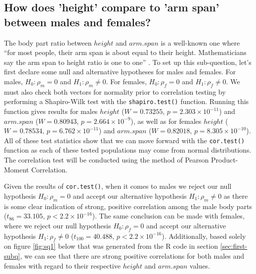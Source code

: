 \documentclass[]{article}
\begin{document}
\subsection{How does 'height' compare to 'arm span' between males and females?}
\label{sec:rq2}

The body part ratio between \(height\) and \(arm.span\) is a well-known
one where \enquote{for most people, their arm span is about equal to
their height. Mathematicians say the arm span to height ratio is one to
one} \citep{Brabandere:2017}. To set up this sub-question, let's first
declare some null and alternative hypotheses for males and females. For
males, \(H_0:\rho_m=0\) and \(H_1:\rho_m\neq0\). For females,
\(H_0:\rho_f=0\) and \(H_1:\rho_f\neq0\). We must also check both
vectors for normality prior to correlation testing by performing a
Shapiro-Wilk test with the \texttt{shapiro.test()} function. Running
this function gives results for males \(height\) (\(W=0.73255\),
\(p=2.303\times10^{-11}\)) and \(arm.span\) (\(W=0.80943\),
\(p=2.664\times10^{-9}\)), as well as for females \(height\)
(\(W=0.78534\), \(p=6.762\times10^{-11}\)) and \(arm.span\)
(\(W=0.82018\), \(p=8.305\times10^{-10}\)). All of these test statistics
show that we can move forward with the \texttt{cor.test()} function as
each of these tested populations may come from normal distributions. The
correlation test will be conducted using the method of Pearson
Product-Moment Correlation.

\vspace{0.25cm}

Given the results of \texttt{cor.test()}, when it comes to males we
reject our null hypothesis \(H_0:\rho_m=0\) and accept our alternative
hypothesis \(H_1:\rho_m\neq0\) as there is some clear indication of
strong, positive correlation among the male body parts
(\(t_{86}=33.105\), \(p<2.2\times10^{-16}\)). The same conclusion can be
made with females, where we reject our null hypothesis \(H_0:\rho_f=0\)
and accept our alternative hypothesis \(H_1:\rho_f\neq0\)
(\(t_{100}=40.488\), \(p<2.2\times10^{-16}\)). Additionally, based
solely on figure \ref{fig:sq1} below that was generated from the R code
in section \ref{sec:first-subq}, we can see that there are strong
positive correlations for both males and females with regard to their
respective \(height\) and \(arm.span\) values.
\end{document}
